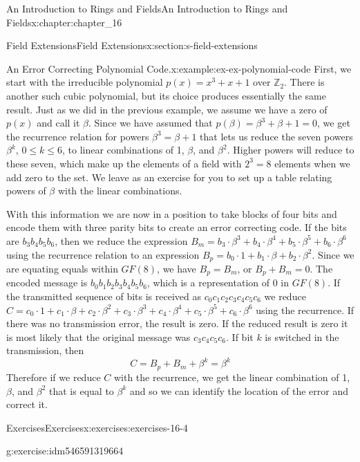 \documentclass[oneside,10pt,]{book}
\numberwithin{equation}{section}
\begin{document}
\begin{chapterptx}{An Introduction to Rings and Fields}{}{An Introduction to Rings and Fields}{}{}{x:chapter:chapter_16}
\begin{sectionptx}{Field Extensions}{}{Field Extensions}{}{}{x:section:s-field-extensions}
\begin{example}{An Error Correcting Polynomial Code.}{x:example:ex-ex-polynomial-code}
First, we start with the irreducible polynomial \(p(x)=x^3 + x + 1\) over \(\mathbb{Z}_2\). There is another such cubic polynomial, but its choice produces essentially the same result.    Just as we did in the previous example, we assume we have a zero of \(p(x)\) and call it  \(\beta\).  Since we have assumed that \(p(\beta)= \beta^3+\beta + 1=0\), we get the recurrence relation for powers \(\beta^3=\beta + 1\) that lets us reduce the seven powers \(\beta^k\), \(0 \leq k \leq 6\), to  linear combinations of 1, \(\beta\), and \(\beta^2\). Higher powers will reduce to these seven, which make up the elements of a field with \(2^3=8\) elements when we add zero to the set.   We leave as an exercise for you to set up a table relating powers of \(\beta\) with the linear combinations.%
\par
With this information we are now in a position to take blocks of four bits and encode them with three parity bits to create an error correcting code.   If the bits are \(b_3b_4b_5b_6\), then we reduce the expression \(B_m= b_3\cdot \beta^3 +b_4\cdot \beta^4 +b_5\cdot \beta^5 +b_6\cdot \beta^6\) using the recurrence relation to an expression \(B_p=b_0\cdot 1 +b_1\cdot \beta +b_2\cdot \beta^2\).   Since we are equating equals within \(GF(8)\), we have \(B_p=B_m\), or \(B_p+B_m=0\).  The encoded message is \(b_0b_1b_2b_3b_4b_5b_6\), which is a representation of 0 in \(GF(8)\).  If the transmitted sequence of bits is received as \(c_0c_1c_2c_3c_4c_5c_6\) we reduce \(C=c_0\cdot 1 +c_1\cdot \beta +c_2\cdot \beta^2 +c_3\cdot \beta^3 +c_4\cdot \beta^4 +c_5\cdot \beta^5 +c_6\cdot \beta^6\) using the recurrence.   If there was no transmission error, the result is zero.  If the reduced result is zero it is most likely that the original message was \(c_3c_4c_5c_6\).  If  bit \(k\) is switched in the transmission, then%
\begin{equation*}
C = B_p+B_m+ \beta^k= \beta^k
\end{equation*}
Therefore if we reduce \(C\) with the recurrence, we get the linear combination of  1, \(\beta\), and \(\beta^2\) that is equal to \(\beta^k\) and so we can identify the location of the error and correct it.%
\end{example}
%
%
\typeout{************************************************}
\typeout{************************************************}
%
\begin{exercises-subsection}{Exercises}{}{Exercises}{}{}{x:exercises:exercises-16-4}
\begin{divisionexercise}{1}{}{}{g:exercise:idm546591319664}%

\end{divisionexercise}
\end{exercises-subsection}
\end{sectionptx}
\end{chapterptx}
\end{document}
